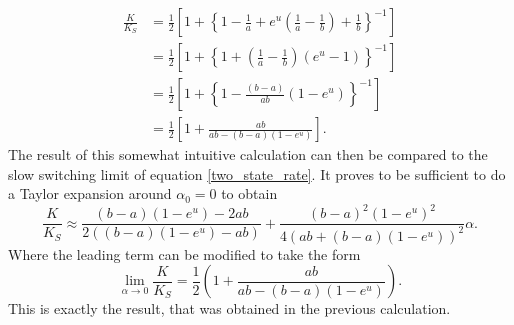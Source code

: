 \begin{align}
    \frac{K}{K_{S}} &= \frac{1}{2} \left[1 + \left\{ 1 -\frac{1}{a} + e^u \left(\frac{1}{a} - \frac{1}{b}  \right) + \frac{1}{b} \right\}^{-1} \right] \nonumber \\
    &= \frac{1}{2}\left[ 1 + \left\{ 1 + \left( \frac{1}{a} - \frac{1}{b} \right)\left( e^u -1 \right) \right\}^{-1} \right] \nonumber \\
    &= \frac{1}{2} \left[ 1 + \left\{ 1 - \frac{(b - a)}{ab}\left(1 - e^u \right) \right\}^{-1} \right] \nonumber \\
    &= \frac{1}{2} \left[ 1 + \frac{ab}{ab - \left( b-a \right)\left(1 - e^u \right)} \right].
    \label{two_state_K_slow}
\end{align}
The result of this somewhat intuitive calculation can then be compared to the slow switching limit of equation \eqref{two_state_rate}.
It proves to be sufficient to do a Taylor expansion around $\alpha_0 = 0$ to obtain
\begin{equation}
    \frac{K}{K_{S}} \approx \frac{(b-a)(1-e^u)-2ab }{2 \left((b-a) \left(1-e^u\right)-ab\right)} + \frac{  (b-a)^2\left(1-e^u\right)^2}{4 \left(ab + (b-a)(1-e^u)\right)^2} \alpha.
    \label{ksa}
\end{equation}
Where the leading term can be modified to take the form
\begin{equation}
    \lim_{\alpha \rightarrow 0} \frac{K}{K_{S}} =\frac{1}{2}\left(1+ \frac{ab}{ab-(b-a) \left(1-e^u\right)}\right).
    \label{klim0a}
\end{equation}
This is exactly the result, that was obtained in the previous calculation.
